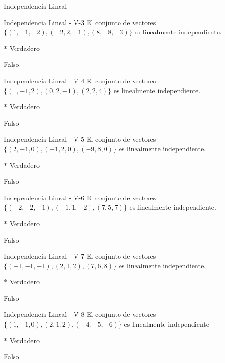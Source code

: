 \documentclass[a4,11pt]{aleph-notas}
\begin{document}
\begin{quiz}{Independencia Lineal}
\begin{multi}[numbering = none, shuffle = false]%
    {Independencia Lineal - V-3}
    El conjunto de vectores $\{ (1,-1,-2) , (-2,2,-1), (8, -8, -3) \}$ es linealmente independiente.
    \item[]* Verdadero 
    \item[] Falso
\end{multi}

\begin{multi}[numbering = none, shuffle = false]%
    {Independencia Lineal - V-4}
    El conjunto de vectores $\{ (1,-1,2) , (0,2,-1), (2, 2, 4) \}$ es linealmente independiente.
    \item[]* Verdadero 
    \item[] Falso
\end{multi}

\begin{multi}[numbering = none, shuffle = false]%
    {Independencia Lineal - V-5}
    El conjunto de vectores $\{ (2,-1,0) , (-1,2,0), (-9, 8, 0) \}$ es linealmente independiente.
    \item[]* Verdadero 
    \item[] Falso
\end{multi}

\begin{multi}[numbering = none, shuffle = false]%
    {Independencia Lineal - V-6}
    El conjunto de vectores $\{ (-2,-2,-1) , (-1,1,-2), (7, 5, 7) \}$ es linealmente independiente.
    \item[]* Verdadero 
    \item[] Falso
\end{multi}

\begin{multi}[numbering = none, shuffle = false]%
    {Independencia Lineal - V-7}
    El conjunto de vectores $\{ (-1,-1,-1) , (2,1,2), (7, 6, 8) \}$ es linealmente independiente.
    \item[]* Verdadero 
    \item[] Falso
\end{multi}

\begin{multi}[numbering = none, shuffle = false]%
    {Independencia Lineal - V-8}
    El conjunto de vectores $\{ (1,-1,0) , (2,1,2), (-4, -5, -6) \}$ es linealmente independiente.
    \item[]* Verdadero 
    \item[] Falso
\end{multi}


\end{quiz}
\end{document}
